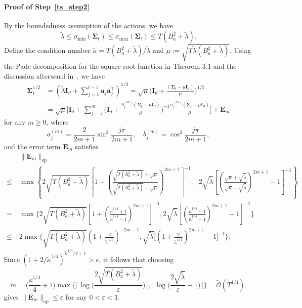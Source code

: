 \documentclass[10pt]{article}
\newcommand{\id}{\bI}
\newcommand{\eps}{\varepsilon}
\newcommand{\lops}[1]{\|{#1}\|_{\mathrm{op}}}
\newcommand{\<}{\left\langle}
\renewcommand{\>}{\right\rangle}
\newcommand{\Tpscov}{{{\mathbf\Sigma}}}
\newcommand{\prodeig}{{\mu}}
\newcommand{\Errmat}{{\mathbf {E}}}
\newcommand{\padecond}{{\tilde \kappa}}
\newcommand{\tcO}{{\tilde{\mathcal O}}}
\def\bI{{\mathbf I}}
\def\ba{{\mathbf a}}
\begin{document}
\paragraph{Proof of Step~\ref{ts_step2}}
By the boundedness assumption of the actions, we have $$\tilde\lambda\leq\sigma_{\min}(\Tpscov_t)\leq\sigma_{\max}(\Tpscov_t)\leq T(B_a^2+\tilde\lambda).$$
Define the condition number $\padecond=T(B_a^2+\tilde\lambda)/\tilde\lambda$ and $\prodeig:=\sqrt{T\tilde\lambda(B_a^2+\tilde\lambda)}$.
Using the Pade decomposition for the  square root function in Theorem 3.1 and the discussion afterward in~\cite{lu1998pade}, we have
\begin{align*}
\Tpscov^{1/2}_t&=(\tilde\lambda\id_d+\sum_{j=1}^{t-1}\ba_j\ba_j^\top)^{1/2}=\sqrt{\prodeig}\Big(\id_d+\frac{(\Tpscov_t-\prodeig \id_d)}{\prodeig}\Big)^{1/2}\\
&=
\sqrt{\prodeig}\Big[\id_d+\sum_{j=1}^m \Big(\id_d+\frac{b_j^{(m)}(\Tpscov_t-\prodeig \id_d)}{\prodeig}\Big)^{-1}\frac{a_j^{(m)}(\Tpscov_t-\prodeig \id_d)}{\prodeig}\Big]+\Errmat_{m}
\end{align*}
for any $m\geq0$,
where
$$
a_j^{(m)}=\frac{2}{2 m+1} \sin ^2 \frac{j \pi}{2 m+1}, \quad b_j^{(m)}=\cos ^2 \frac{j \pi}{2 m+1},
$$ and the error term $\Errmat_m$ satisfies \begin{align*}
&~\lops{\Errmat_m}\\
\leq&~
\max \left\{2 \sqrt{{T(B_a^2+\tilde\lambda)}}\left[1+\left(\frac{\sqrt{T(B_a^2+\tilde\lambda)}+\sqrt{\mu}}{\sqrt{T(B_a^2+\tilde\lambda)}-\sqrt{\mu}}\right)^{2 m+1}\right]^{-1},~~~2 \sqrt{{\tilde\lambda}}\left[\left(\frac{\sqrt{\mu}+\sqrt{\tilde\lambda}}{\sqrt{\mu}-\sqrt{\tilde\lambda}}\right)^{2 m+1}-1\right]^{-1}\right\}
\\
=&~\max\Big\{2\sqrt{{T(B_a^2+\tilde\lambda)}}[1+(\frac{\padecond^{1/4}+1}{\padecond^{1/4}-1})^{2m+1}]^{-1},2\sqrt{\tilde\lambda}[(\frac{\padecond^{1/4}+1}{\padecond^{1/4}-1})^{2m+1}-1]^{-1}\Big\}\\
\leq&~2\max\Big\{\sqrt{{T(B_a^2+\tilde\lambda)}}(1+\frac{2}{\padecond^{1/4}})^{-2m-1},\sqrt{\tilde\lambda}\Big[(1+\frac{2}{\padecond^{1/4}})^{2m+1}- 1\Big]^{-1}\Big\}.
\end{align*}
Since $(1+2/\padecond^{1/4})^{\padecond^{1/4}/2+1}>e$, it follows that choosing $$
m= \Big(\frac{\padecond^{1/4}}{4}+1\Big)\max\Big\{\Big\lceil\log\Big(\frac{2\sqrt{T(B_a^2+\tilde\lambda)}}{\eps}\Big)\Big\rceil,\Big\lceil\log\Big(\frac{2\sqrt{\tilde\lambda}}{\eps}+1\Big)\Big\rceil\Big\}=\tcO(T^{1/4}).
$$ gives $\lops{\Errmat_m}\leq\eps$ for any $0<\eps<1$.
\end{document}
